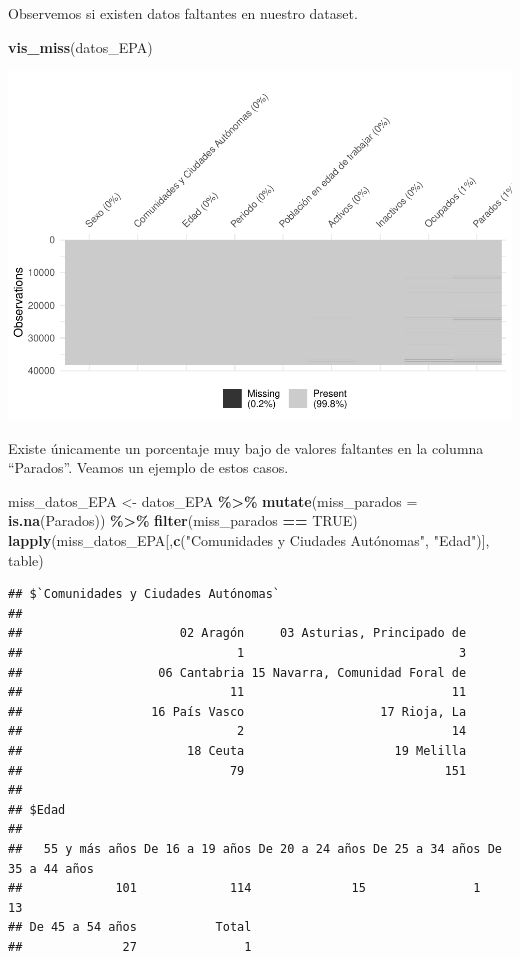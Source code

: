 \documentclass[notspecified,article,submit,moreauthors,pdftex]{Definitions/mdpi}
\newenvironment{Shaded}{\begin{snugshade}}{\end{snugshade}}
\newcommand{\AttributeTok}[1]{\textcolor[rgb]{0.13,0.29,0.53}{#1}}
\newcommand{\ConstantTok}[1]{\textcolor[rgb]{0.56,0.35,0.01}{#1}}
\newcommand{\FunctionTok}[1]{\textcolor[rgb]{0.13,0.29,0.53}{\textbf{#1}}}
\newcommand{\NormalTok}[1]{#1}
\newcommand{\OtherTok}[1]{\textcolor[rgb]{0.56,0.35,0.01}{#1}}
\newcommand{\SpecialCharTok}[1]{\textcolor[rgb]{0.81,0.36,0.00}{\textbf{#1}}}
\newcommand{\StringTok}[1]{\textcolor[rgb]{0.31,0.60,0.02}{#1}}
\begin{document}
Observemos si existen datos faltantes en nuestro dataset.

\begin{Shaded}
\begin{Highlighting}[]
\FunctionTok{vis\_miss}\NormalTok{(datos\_EPA)}
\end{Highlighting}
\end{Shaded}

\includegraphics{ProyectoAED2024_files/figure-latex/unnamed-chunk-7-1.pdf}

Existe únicamente un porcentaje muy bajo de valores faltantes en la
columna ``Parados''. Veamos un ejemplo de estos casos.

\begin{Shaded}
\begin{Highlighting}[]
\NormalTok{miss\_datos\_EPA }\OtherTok{\textless{}{-}}\NormalTok{ datos\_EPA }\SpecialCharTok{\%\textgreater{}\%} \FunctionTok{mutate}\NormalTok{(}\AttributeTok{miss\_parados =} \FunctionTok{is.na}\NormalTok{(Parados)) }\SpecialCharTok{\%\textgreater{}\%} \FunctionTok{filter}\NormalTok{(miss\_parados }\SpecialCharTok{==} \ConstantTok{TRUE}\NormalTok{)}
\FunctionTok{lapply}\NormalTok{(miss\_datos\_EPA[,}\FunctionTok{c}\NormalTok{(}\StringTok{"Comunidades y Ciudades Autónomas"}\NormalTok{, }\StringTok{"Edad"}\NormalTok{)], table)}
\end{Highlighting}
\end{Shaded}

\begin{verbatim}
## $`Comunidades y Ciudades Autónomas`
## 
##                      02 Aragón     03 Asturias, Principado de 
##                              1                              3 
##                   06 Cantabria 15 Navarra, Comunidad Foral de 
##                             11                             11 
##                  16 País Vasco                   17 Rioja, La 
##                              2                             14 
##                       18 Ceuta                     19 Melilla 
##                             79                            151 
## 
## $Edad
## 
##   55 y más años De 16 a 19 años De 20 a 24 años De 25 a 34 años De 35 a 44 años 
##             101             114              15               1              13 
## De 45 a 54 años           Total 
##              27               1
\end{verbatim}
\end{document}
